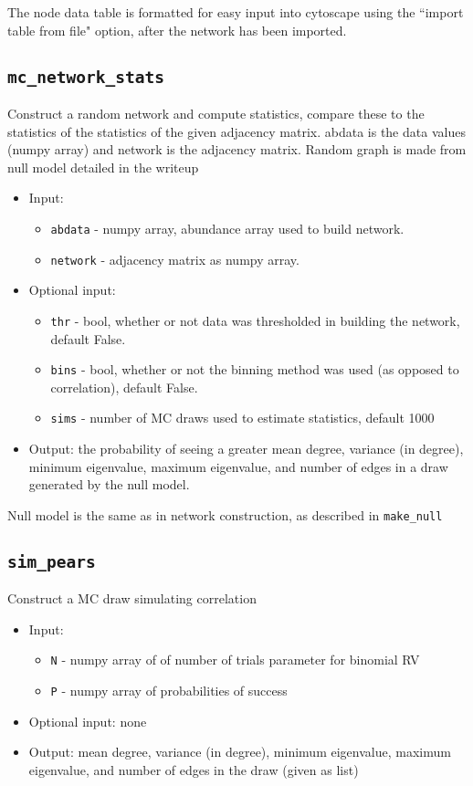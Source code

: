\documentclass[10pt]{article}
\theoremstyle{definition}
\numberwithin{theorem}{section}
\numberwithin{definition}{section}
\numberwithin{lemma}{section}
\numberwithin{corollary}{section}
\numberwithin{clm}{section}
\numberwithin{rmk}{section}
\begin{document}
The node data table is formatted for easy input into cytoscape using the ``import table from file" option, after the network has been imported.

\cprotect \subsection{\verb|mc_network_stats|}
Construct a random network and compute statistics, compare these to the statistics of
the statistics of the given adjacency matrix. abdata is the data values (numpy
array) and network is the adjacency matrix. Random graph is made from null model detailed
in the writeup

\begin{itemize}
	\item Input: 
	\begin{itemize}
		\item \verb|abdata| -  numpy array, abundance array used to build network. 
		\item \verb|network| -  adjacency matrix as numpy array.
	\end{itemize}
	\item Optional input:
	\begin{itemize}
		\item \verb|thr| - bool, whether or not data was thresholded in building the network, default False.
		\item  \verb|bins| - bool, whether or not the binning method was used (as opposed to correlation), default False.
		\item  \verb|sims| - number of MC draws used to estimate statistics, default 1000
	\end{itemize}
	\item Output: the probability of seeing a greater mean degree, variance (in degree), minimum eigenvalue, maximum eigenvalue, and number of edges in a draw generated by the null model.
\end{itemize}

Null model is the same as in network construction, as described in \verb|make_null|

\cprotect \subsection{\verb|sim_pears|}
Construct a MC draw simulating correlation
\begin{itemize}
	\item Input: 
	\begin{itemize}
		\item \verb|N| - numpy array of of number of trials parameter for binomial RV
		\item  \verb|P| - numpy array of probabilities of success
	\end{itemize}
	\item Optional input: none
	\item Output: mean degree, variance (in degree), minimum eigenvalue, maximum eigenvalue, and number of edges in the draw (given as list)
\end{itemize}
\end{document}
